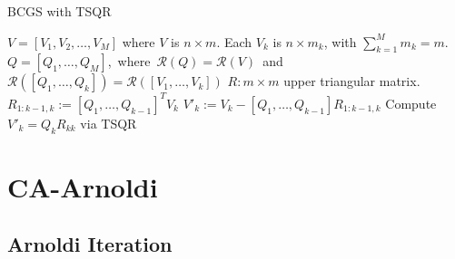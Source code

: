 \documentclass{scrartcl}
\numberwithin{equation}{section}
\begin{document}
\begin{algorithm}
\caption{BCGS with TSQR}
\label{alg:bcgs}
\begin{algorithmic}[1]
    \REQUIRE $V = \left[V_1, V_2, \ldots, V_M\right]$ where $V$ is $n \times m$. Each $V_k$ is $n \times m_k$, with $\sum^M_{k=1}m_k = m$.
    \ENSURE \mbox{$Q = \left[Q_1, \ldots, Q_M\right]$, where $\mathcal{R}(Q) = \mathcal{R}(V)$ and $\mathcal{R}(\left[Q_1, \ldots, Q_k \right]) = \mathcal{R}(\left[V_1, \ldots, V_k \right])$}
    \ENSURE $R: m \times m$ upper triangular matrix.
    	\STATE $R_{1:k-1,k} := [Q_1, \ldots, Q_{k - 1}]^TV_k$
    	\STATE $V'_k := V_k - [Q_1, \ldots, Q_{k - 1}]R_{1:k - 1, k}$
    	\STATE Compute $V'_k = Q_kR_{kk}$ via TSQR
    \ENDFOR
\end{algorithmic}
\end{algorithm}

\section{CA-Arnoldi}\label{sec:ca_arnoldi}
\subsection{Arnoldi Iteration}
\end{document}
